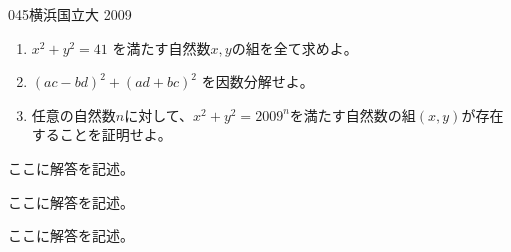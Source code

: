 \begin{thm}{045}{}{横浜国立大 2009}
 \begin{enumerate}
  \item $x^2+y^2=41$ を満たす自然数$x,y$の組を全て求めよ。
  \item $(ac-bd)^2+(ad+bc)^2$ を因数分解せよ。
  \item 任意の自然数$n$に対して、$x^2+y^2=2009^n$を満たす自然数の組$(x,y)$が存在することを証明せよ。
 \end{enumerate}
\end{thm}

ここに解答を記述。

ここに解答を記述。

ここに解答を記述。